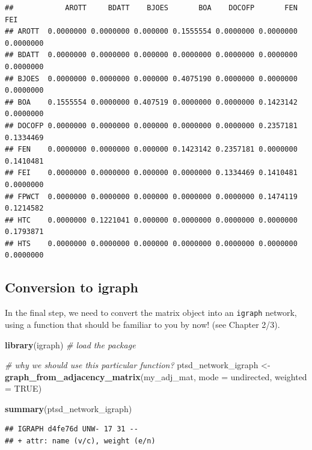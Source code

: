 \documentclass[
]{book}
\newenvironment{Shaded}{\begin{snugshade}}{\end{snugshade}}
\newcommand{\AttributeTok}[1]{\textcolor[rgb]{0.13,0.29,0.53}{#1}}
\newcommand{\CommentTok}[1]{\textcolor[rgb]{0.56,0.35,0.01}{\textit{#1}}}
\newcommand{\ConstantTok}[1]{\textcolor[rgb]{0.56,0.35,0.01}{#1}}
\newcommand{\FunctionTok}[1]{\textcolor[rgb]{0.13,0.29,0.53}{\textbf{#1}}}
\newcommand{\NormalTok}[1]{#1}
\newcommand{\OtherTok}[1]{\textcolor[rgb]{0.56,0.35,0.01}{#1}}
\newcommand{\StringTok}[1]{\textcolor[rgb]{0.31,0.60,0.02}{#1}}
\begin{document}
\begin{verbatim}
##            AROTT     BDATT    BJOES       BOA    DOCOFP       FEN       FEI
## AROTT  0.0000000 0.0000000 0.000000 0.1555554 0.0000000 0.0000000 0.0000000
## BDATT  0.0000000 0.0000000 0.000000 0.0000000 0.0000000 0.0000000 0.0000000
## BJOES  0.0000000 0.0000000 0.000000 0.4075190 0.0000000 0.0000000 0.0000000
## BOA    0.1555554 0.0000000 0.407519 0.0000000 0.0000000 0.1423142 0.0000000
## DOCOFP 0.0000000 0.0000000 0.000000 0.0000000 0.0000000 0.2357181 0.1334469
## FEN    0.0000000 0.0000000 0.000000 0.1423142 0.2357181 0.0000000 0.1410481
## FEI    0.0000000 0.0000000 0.000000 0.0000000 0.1334469 0.1410481 0.0000000
## FPWCT  0.0000000 0.0000000 0.000000 0.0000000 0.0000000 0.1474119 0.1214582
## HTC    0.0000000 0.1221041 0.000000 0.0000000 0.0000000 0.0000000 0.1793871
## HTS    0.0000000 0.0000000 0.000000 0.0000000 0.0000000 0.0000000 0.0000000
\end{verbatim}

\subsection{Conversion to igraph}\label{conversion-to-igraph}

In the final step, we need to convert the matrix object into an \texttt{igraph} network, using a function that should be familiar to you by now! (see Chapter 2/3).

\begin{Shaded}
\begin{Highlighting}[]
\FunctionTok{library}\NormalTok{(igraph) }\CommentTok{\# load the package}

\CommentTok{\# why we should use this particular function? }
\NormalTok{ptsd\_network\_igraph }\OtherTok{\textless{}{-}} \FunctionTok{graph\_from\_adjacency\_matrix}\NormalTok{(my\_adj\_mat, }
                                                   \AttributeTok{mode =} \StringTok{\textquotesingle{}undirected\textquotesingle{}}\NormalTok{, }
                                                   \AttributeTok{weighted =} \ConstantTok{TRUE}\NormalTok{)}

\FunctionTok{summary}\NormalTok{(ptsd\_network\_igraph)}
\end{Highlighting}
\end{Shaded}

\begin{verbatim}
## IGRAPH d4fe76d UNW- 17 31 -- 
## + attr: name (v/c), weight (e/n)
\end{verbatim}
\end{document}
